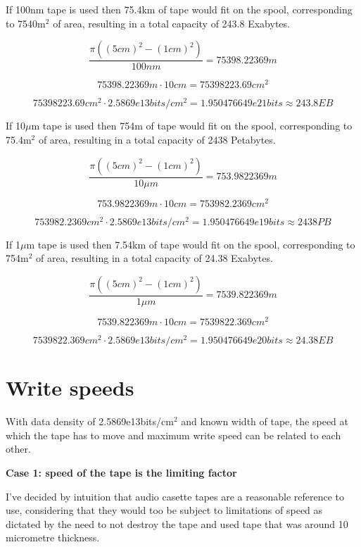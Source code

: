 \documentclass[a4paper]{article}
\begin{document}
	If 100nm tape is used then 75.4km of tape would fit on the spool, corresponding to 7540m$^2$ of area, resulting in a total capacity of 243.8 Exabytes.
	
	$$ \frac{\pi ((5cm)^2 - (1cm)^2)}{100nm} =  75398.22369 m$$
	
	$$ 75398.22369 m \cdot 10cm =  75398223.69 cm^2 $$
	
	$$ 75398223.69 cm^2 \cdot 2.5869e13bits/cm^2 = 1.950476649e21 bits \approx 243.8EB $$
	
	\vfill
	
	If 10$\mu$m tape is used then 754m of tape would fit on the spool, corresponding to 75.4m$^2$ of area, resulting in a total capacity of 2438 Petabytes.
	
	$$ \frac{\pi ((5cm)^2 - (1cm)^2)}{10\mu m} = 753.9822369 m $$
	
	$$ 753.9822369 m \cdot 10cm =  753982.2369 cm^2 $$
	
	$$ 753982.2369 cm^2 \cdot 2.5869e13bits/cm^2 = 1.950476649e19 bits \approx 2438PB $$
	
	\vfill
	
	If 1$\mu$m tape is used then 7.54km of tape would fit on the spool, corresponding to 754m$^2$ of area, resulting in a total capacity of 24.38 Exabytes.
	
	$$ \frac{\pi ((5cm)^2 - (1cm)^2)}{1\mu m} = 7539.822369 m $$
	
	$$ 7539.822369 m \cdot 10cm =  7539822.369 cm^2 $$
	
	$$ 7539822.369 cm^2 \cdot 2.5869e13bits/cm^2 = 1.950476649e20 bits \approx 24.38EB $$
	
	\pagebreak
	
	\section{Write speeds}
	
	With data density of 2.5869e13bits/cm$^2$ and known width of tape, the speed at which the tape has to move and maximum write speed can be related to each other.
	
	\medskip
	
	\begin{center}
		\textbf{Case 1: speed of the tape is the limiting factor}
	\end{center}
	
	\medskip
	
	I've decided by intuition that audio casette tapes are a reasonable reference to use, considering that they would too be subject to limitations of speed as dictated by the need to not destroy the tape and used tape that was around 10 micrometre thickness.
	
\end{document}

